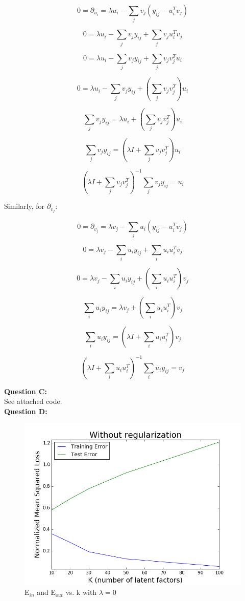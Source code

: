 \documentclass[12 pt]{article}
\begin{document}
	\[0 = \partial_{u_i} = \lambda u_i - \sum_{j}v_j (y_{ij} - u_i^Tv_j)\]
	
	\[0 = \lambda u_i - \sum_{j}v_j y_{ij} + \sum_{j} v_j u_i^Tv_j\]
	
	\[0 = \lambda u_i - \sum_{j}v_j y_{ij} + \sum_{j} v_j v_j^T u_i\]
	
	\[0 = \lambda u_i - \sum_{j}v_j y_{ij} +  (\sum_{j} v_j v_j^T)u_i\]
	
	\[\sum_{j}v_j y_{ij} = \lambda u_i  + (\sum_{j} v_j v_j^T)u_i \]
	
	\[\sum_{j}v_j y_{ij} = (\lambda I +  \sum_{j} v_j v_j^T) u_i\]
	
	\[(\lambda I +  \sum_{j} v_j v_j^T)^{-1} \sum_{j}v_j y_{ij} = u_i\]
	
	Similarly, for $\partial_{v_j}$: 
	
	\[0 = \partial_{v_j} = \lambda v_j - \sum_{i}u_i (y_{ij} - u_i^Tv_j)\]
	
	\[0 = \lambda v_j - \sum_{i}u_i y_{ij} + \sum_{i} u_i u_i^Tv_j\]
	
	
	\[0 = \lambda v_j - \sum_{i} u_i y_{ij} +  (\sum_{i}  u_i  u_i^T)v_j\]
	
	\[\sum_{i} u_i y_{ij} = \lambda v_j  + (\sum_{i}  u_i u_i^T)v_j \]
	
	\[\sum_{i} u_i y_{ij} = (\lambda I +  \sum_{i}  u_i  u_i^T) v_j\]
	
	\[(\lambda I +  \sum_{i}  u_i  u_i^T)^{-1} \sum_{i}u_i y_{ij} = v_j\]
	
	
	
	

	
	\noindent\textbf{Question C:}  \\
	See attached code. \\
	
	\noindent\textbf{Question D:} \\
	\begin{figure}[H]
	\centering
	\includegraphics[width=\textwidth]{2D}
	\caption{E$_{in}$ and E$_{out}$ vs. k with $\lambda = 0$}
	\end{figure}
	
\end{document}
